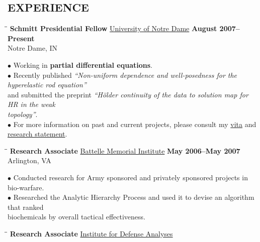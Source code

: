 \documentclass{resume}
\begin{document}
\begin{resume}
		 \section{EXPERIENCE}
	\vspace{-0.1in}	
    \begin{tabbing}
		\hspace{2.3in}\= \hspace{2.6in}\= \kill
        {\bf Schmitt Presidential Fellow} \>\href{http://nd.edu/}{University of Notre Dame}     
	\>\textbf{August 2007--Present} \\
		\>Notre Dame, IN 
	\end{tabbing}\vspace{-15pt}    
	$\bullet$ Working in \textbf{partial differential equations}.  
\\
$\bullet$ Recently published \textit{``Non-uniform dependence and well-posedness for the hyperelastic rod
equation''} \\
\phantom{$\bullet$} and submitted the preprint \textit{``H\"older continuity of the data to solution map for HR in the weak \\
\phantom{$\bullet$} topology''}. 
\\
$\bullet$ For more information on past and current projects, please consult
my \href{http://davidkarapetyan.com/pdfs/cv.pdf}{vita} and
\href{http://davidkarapetyan.com/pdfs/research-statement.pdf}{research
statement}. 	
	\begin{tabbing}
		\hspace{2.3in}\= \hspace{2.6in}\= \kill
        {\bf Research Associate} \>\href{http://www.battelle.org/}{Battelle
        Memorial Institute}     
	\>\textbf{May 2006--May 2007} \\
		\>Arlington, VA
	\end{tabbing}\vspace{-15pt}    
	$\bullet$ Conducted research for Army sponsored and privately sponsored projects 
	in bio-warfare. \\ 
      $\bullet$ Researched the Analytic Hierarchy Process 
	and used it to devise an algorithm that ranked \\
	\phantom{$\bullet$} biochemicals by 
	overall tactical effectiveness.
	\begin{tabbing}
		\hspace{2.3in}\= \hspace{2.6in}\= \kill
        {\bf Research Associate } \>\href{https://www.ida.org/}{Institute for
        Defense Analyses} \>  

\end{tabbing}
\end{resume}
\end{document}
